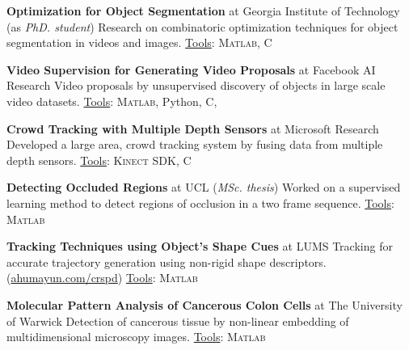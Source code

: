 \documentclass[10pt,twoside,a4paper]{article}
\newif\ifdetail
\newcommand\CPP{C\nolinebreak[4]\hspace{-.05em}\raisebox{.4ex}{\relsize{-3}{\textbf{++}}}}
\begin{document}
\textbf{Optimization for Object Segmentation} at Georgia Institute of Technology (as \textit{PhD. student}) \newline
Research on combinatoric optimization techniques for object segmentation in videos and images. \underline{Tools}: \textsc{Matlab}, \CPP

\textbf{Video Supervision for Generating Video Proposals} at Facebook AI Research \newline
\ifdetail Research on generating video \else Video \fi proposals by unsupervised discovery of objects in large scale video datasets. \underline{Tools}: \textsc{Matlab}, Python, \CPP, \ifdetail Javascript, PHP \fi

\ifdetail
\textbf{Object Proposals for CT Images} at Georgia Institute of Technology (as \textit{PhD. student}) \newline
Supervising a project for generating segmentation proposals in 3D CT scans, leading to detection of organs.
\fi

\textbf{Crowd Tracking with Multiple Depth Sensors} at Microsoft Research \newline
Developed a large area, crowd tracking system by fusing data from multiple depth sensors. \underline{Tools}: \textsc{Kinect SDK}, \CPP

\textbf{Detecting Occluded Regions} at UCL (\textit{MSc. thesis})\newline
Worked on a supervised learning method to detect regions of occlusion in a two frame sequence. \underline{Tools}: \textsc{Matlab}

\textbf{Tracking Techniques using Object's Shape Cues} at LUMS \newline
\ifdetail Researched tracking techniques for accurate generation of trajectories using object's non-rigid shape descriptors, resilient to occlusion. This was partly funded by NSF. \else Tracking for accurate trajectory generation using non-rigid shape descriptors. \fi (\href{http://ahumayun.com/crspd.html}{ahumayun.com/crspd}) \underline{Tools}: \textsc{Matlab}

\textbf{Molecular Pattern Analysis of Cancerous Colon Cells} at The University of Warwick \newline
\ifdetail A multi-disciplinary project for the detection of cancerous tissue. We developed registration and non-linear embedding techniques for analysis of tissues from a multidimensional imaging process. \else Detection of cancerous tissue by non-linear embedding of multidimensional microscopy images. \fi \underline{Tools}: \textsc{Matlab}
\end{document}

